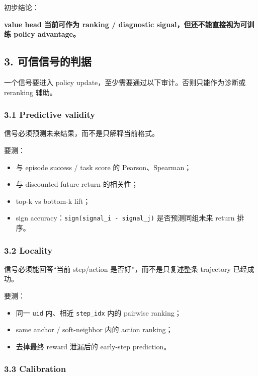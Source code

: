 \documentclass[
  10pt,
]{ctexart}
\providecommand{\tightlist}{%
  \setlength{\itemsep}{0pt}\setlength{\parskip}{0pt}}
\begin{document}
初步结论：

\textbf{value head 当前可作为 ranking / diagnostic
signal，但还不能直接视为可训练 policy advantage。}

\subsection{3.
可信信号的判据}\label{ux53efux4fe1ux4fe1ux53f7ux7684ux5224ux636e}

一个信号要进入 policy update，至少需要通过以下审计。否则只能作为诊断或
reranking 辅助。

\subsubsection{3.1 Predictive validity}\label{predictive-validity}

信号必须预测未来结果，而不是只解释当前格式。

要测：

\begin{itemize}
\tightlist
\item
  与 episode success / task score 的 Pearson、Spearman；
\item
  与 discounted future return 的相关性；
\item
  top-k vs bottom-k lift；
\item
  sign accuracy：\texttt{sign(signal\_i\ -\ signal\_j)} 是否预测同组未来
  return 排序。
\end{itemize}

\subsubsection{3.2 Locality}\label{locality}

信号必须能回答``当前 step/action 是否好''，而不是只复述整条 trajectory
已经成功。

要测：

\begin{itemize}
\tightlist
\item
  同一 \texttt{uid} 内、相近 \texttt{step\_idx} 内的 pairwise ranking；
\item
  same anchor / soft-neighbor 内的 action ranking；
\item
  去掉最终 reward 泄漏后的 early-step prediction。
\end{itemize}

\subsubsection{3.3 Calibration}\label{calibration}
\end{document}
